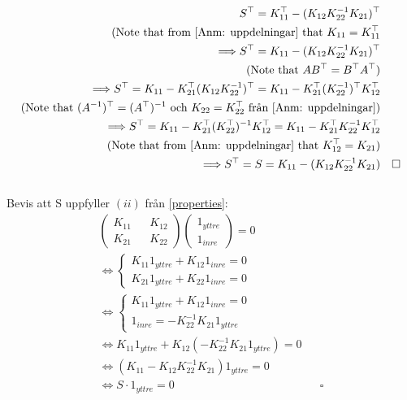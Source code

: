 \documentclass{assignment}
\begin{document}
\begin{align}
    S^\top = K_{11}^\top - (K_{12}K_{22}^{-1}K_{21})^\top
    \\ \nonumber \text{(Note that from \cref{Anm: uppdelningar} that $K_{11}=K_{11}^\top$}
    \\ \nonumber \Longrightarrow S^\top = K_{11} -(K_{12}K_{22}^{-1}K_{21})^\top
    \\ \nonumber \text{(Note that $AB^\top = B^\top A^\top $)}
    \\ \nonumber \Longrightarrow S^\top = K_{11} - K_{21}^\top (K_{12}K_{22}^{-1})^\top = K_{11} -K_{21}^\top (K_{22}^{-1})^\top K_{12}^\top
    \\ \nonumber \text{(Note that $(A^{-1})^\top = (A^\top)^{-1} $ och $K_{22} = K_{22}^\top$ från \cref{Anm: uppdelningar})}
    \\ \nonumber \Longrightarrow S^\top = K_{11} -K_{21}^\top (K_{22}^\top)^{-1} K_{12}^\top = K_{11} -K_{21}^\top K_{22}^{-1} K_{12}^\top 
    \\ \nonumber \text{(Note that from \cref{Anm: uppdelningar} that $K_{12}^\top = K_{21}$)}
    \\ \Longrightarrow S^\top = S = K_{11}- (K_{12}K_{22}^{-1}K_{21}) && \square
\end{align}
\\ Bevis att S uppfyller $(ii)$ från \cref{properties}:
\begin{align}
    \begin{pmatrix}
        K_{11} && K_{12}
        \\ K_{21} && K_{22} 
    \end{pmatrix}
    \begin{pmatrix}
        1_{yttre}
        \\ 1_{inre}
    \end{pmatrix} = 0
    \\ \nonumber \Longleftrightarrow
    \left\{\begin{matrix}
        K_{11}1_{yttre}+K_{12}1_{inre} = 0
        \\ K_{21}1_{yttre}+K_{22}1_{inre} = 0
    \end{matrix}\right.
    \\ \nonumber \Longleftrightarrow
    \left\{\begin{matrix}
        K_{11}1_{yttre}+K_{12}1_{inre} = 0
        \\ 1_{inre} = -K_{22}^{-1}K_{21}1_{yttre}
    \end{matrix}\right.
    \\ \nonumber \Longleftrightarrow
    K_{11}1_{yttre}+K_{12}(-K_{22}^{-1}K_{21}1_{yttre}) = 0
    \\ \nonumber \Longleftrightarrow
    (K_{11}-K_{12}K_{22}^{-1}K_{21})1_{yttre} = 0
    \\ \Longleftrightarrow
    S\cdot1_{yttre} = 0 && \square
\end{align} 
\end{document}
